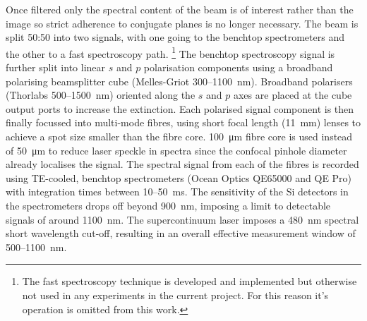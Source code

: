 \documentclass{article}
\begin{document}
Once filtered only the spectral content of the beam is of interest rather than the image so strict adherence to conjugate planes is no longer necessary. The beam is split 50:50 into two signals, with one going to the benchtop spectrometers and the other to a fast spectroscopy path.%
\footnote{The fast spectroscopy technique is developed and implemented but otherwise not used in any experiments in the current project. For this reason it's operation is omitted from this work.}
The benchtop spectroscopy signal is further split into linear $s$ and $p$ polarisation components using a broadband polarising beamsplitter cube (Melles-Griot 300--\SI{1100}{nm}). Broadband polarisers (Thorlabs 500--\SI{1500}{nm}) oriented along the $s$ and $p$ axes are placed at the cube output ports to increase the extinction. Each polarised signal component is then finally focussed into multi-mode fibres, using short focal length (\SI{11}{mm}) lenses to achieve a spot size smaller than the fibre core. \SI{100}{\micro\metre} fibre core is used instead of \SI{50}{\micro\metre} to reduce laser speckle in spectra since the confocal pinhole diameter already localises the signal.
The spectral signal from each of the fibres is recorded using TE-cooled, benchtop spectrometers (Ocean Optics QE65000 and QE Pro) with integration times between 10--\SI{50}{ms}. The sensitivity of the Si detectors in the spectrometers drops off beyond \SI{900}{nm}, imposing a limit to detectable signals of around \SI{1100}{nm}. The supercontinuum laser imposes a \SI{480}{nm} spectral short wavelength cut-off, resulting in an overall effective measurement window of 500--\SI{1100}{nm}.
\end{document}
